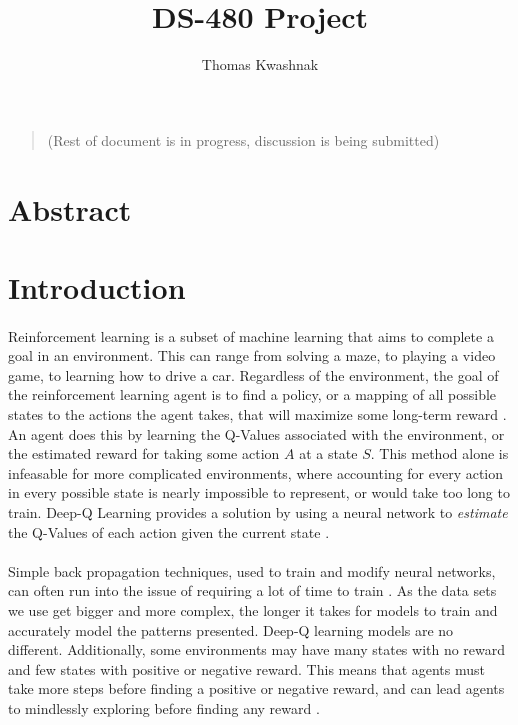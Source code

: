 \documentclass[12pt]{article}
\author{Thomas Kwashnak}
\title{DS-480 Project}
\begin{document}
\maketitle

\newpage

\tableofcontents

\newpage

\begin{quote}
	(Rest of document is in progress, discussion is being submitted)
\end{quote}

\section{Abstract}

\section{Introduction}



\paragraph{}
Reinforcement learning is a subset of machine learning that aims to complete a goal in an environment.
This can range from solving a maze, to playing a video game, to learning how to drive a car.
Regardless of the environment, the goal of the reinforcement learning agent is to find a policy, or a mapping of all possible states to the actions the agent takes, that will maximize some long-term reward \cite{article_reinforcement_learning_survey}.
An agent does this by learning the Q-Values associated with the environment, or the estimated reward for taking some action $A$ at a state $S$.
This method alone is infeasable for more complicated environments, where accounting for every action in every possible state is nearly impossible to represent, or would take too long to train.
Deep-Q Learning provides a solution by using a neural network to \textit{estimate} the Q-Values of each action given the current state \cite{article_human_level_control_deep_reinforcement_learning}.

\paragraph{}
Simple back propagation techniques, used to train and modify neural networks, can often run into the issue of requiring a lot of time to train \cite{article_accelerating_neural_networks_weight_extrapolations}.
As the data sets we use get bigger and more complex, the longer it takes for models to train and accurately model the patterns presented.
Deep-Q learning models are no different.
Additionally, some environments may have many states with no reward and few states with positive or negative reward.
This means that agents must take more steps before finding a positive or negative reward, and can lead agents to mindlessly exploring before finding any reward \cite{article_approx_optimal_approximate_reinforcement_learning}.
\end{document}
